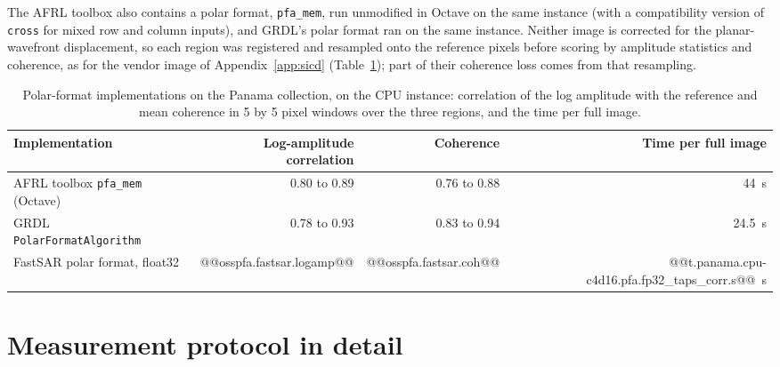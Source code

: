 \documentclass[11pt]{article}
\begin{document}
The AFRL toolbox also contains a polar format, \texttt{pfa\_mem}, run unmodified in Octave on the same instance (with a compatibility version of \texttt{cross} for mixed row and column inputs), and GRDL's polar format ran on the same instance. Neither image is corrected for the planar-wavefront displacement, so each region was registered and resampled onto the reference pixels before scoring by amplitude statistics and coherence, as for the vendor image of Appendix~\ref{app:sicd} (Table~\ref{tab:osspfa}); part of their coherence loss comes from that resampling.

\begin{table}[tb]
\centering
\caption{Polar-format implementations on the Panama collection, on the CPU instance: correlation of the log amplitude with the reference and mean coherence in 5 by 5 pixel windows over the three regions, and the time per full image.}
\label{tab:osspfa}
\small
\begin{tabular}{lrrr}
\toprule
Implementation & Log-amplitude correlation & Coherence & Time per full image \\
\midrule
AFRL toolbox \texttt{pfa\_mem} (Octave) & 0.80 to 0.89 & 0.76 to 0.88 & 44~s \\
GRDL \texttt{PolarFormatAlgorithm} & 0.78 to 0.93 & 0.83 to 0.94 & 24.5~s \\
FastSAR polar format, float32 & @@osspfa.fastsar.logamp@@ & @@osspfa.fastsar.coh@@ & @@t.panama.cpu-c4d16.pfa.fp32_taps_corr.s@@~s \\
\bottomrule
\end{tabular}
\end{table}

\section{Measurement protocol in detail}
\label{app:protocol}
\end{document}
